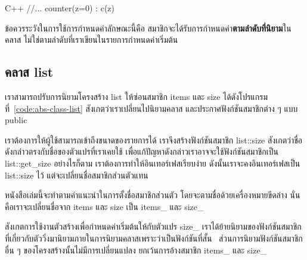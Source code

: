 \latintext
\begin{codelist}{C++}{}
  //...
  counter(z=0) : c(z) {}
\end{codelist}
\thaitext

ข้อ{\wbr}ควร{\wbr}ระวัง{\wbr}ใน{\wbr}การ{\wbr}ใช้{\wbr}การ{\wbr}กำหนด{\wbr}ค่า{\wbr}ลักษณะ{\wbr}นี้{\wbr}คือ{\wbr}
สมาชิก{\wbr}จะ{\wbr}ได้{\wbr}รับ{\wbr}การ{\wbr}กำหนด{\wbr}ค่า{\bf ตาม{\wbr}ลำดับ{\wbr}ที่{\wbr}นิยาม}ใน{\wbr}ค{\wbr}ลา{\wbr}ส
ไม่{\wbr}ใช่{\wbr}ตาม{\wbr}ลำดับ{\wbr}ที่{\wbr}เรา{\wbr}เขียน{\wbr}ใน{\wbr}รายการ{\wbr}กำหนด{\wbr}ค่า{\wbr}เริ่มต้น{\wbr}

\subsection{ค{\wbr}ลา{\wbr}ส {\ct list}}

เรา{\wbr}สามารถ{\wbr}ปรับ{\wbr}การ{\wbr}นิยาม{\wbr}โครงสร้าง {\ct list} ให้{\wbr}ซ่อน{\wbr}สมาชิก {\ct items} และ {\ct
  size} ได้{\wbr}ดัง{\wbr}โปรแกรม{\wbr}ที่~\ref{code:abs-class-list}
สังเกต{\wbr}ว่า{\wbr}เรา{\wbr}เปลี่ยน{\wbr}ไป{\wbr}นิยาม{\wbr}ค{\wbr}ลา{\wbr}ส และ{\wbr}ประกาศ{\wbr}ฟังก์ชัน{\wbr}สมาชิก{\wbr}ต่าง ๆ แบบ {\ct public}

เรา{\wbr}ต้องการ{\wbr}ให้{\wbr}ผู้ใช้{\wbr}สามารถ{\wbr}เข้าถึง{\wbr}ขนาด{\wbr}ของ{\wbr}รายการ{\wbr}ได้ เรา{\wbr}จึง{\wbr}สร้าง{\wbr}ฟังก์ชัน{\wbr}สมาชิก {\ct
  list::size} สังเกต{\wbr}ว่า{\wbr}ชื่อดัง{\wbr}กล่าว{\wbr}ตรง{\wbr}กับ{\wbr}ชื่อ{\wbr}ของ{\wbr}ตัวแปร{\wbr}ที่{\wbr}เรา{\wbr}เคย{\wbr}ใช้{\wbr}
เพื่อ{\wbr}แก้{\wbr}ปัญหา{\wbr}ดังกล่าว{\wbr}เรา{\wbr}อาจ{\wbr}จะ{\wbr}ใช้{\wbr}ฟังก์ชัน{\wbr}สมาชิก{\wbr}เป็น {\ct list::get\_size}
อย่างไรก็ตาม เรา{\wbr}ต้องการ{\wbr}ทำ{\wbr}ให้{\wbr}อิน{\wbr}เทอร์เฟส{\wbr}เรียบ{\wbr}ง่าย ดังนั้น{\wbr}เรา{\wbr}จะ{\wbr}คง{\wbr}อิน{\wbr}เทอร์เฟส{\wbr}เป็น {\ct
  list::size} ไว้ แต่{\wbr}จะ{\wbr}เปลี่ยน{\wbr}ชื่อ{\wbr}สมาชิก{\wbr}ส่วนตัว{\wbr}แทน{\wbr}

หนังสือ{\wbr}เล่ม{\wbr}นี้{\wbr}จะ{\wbr}ทำ{\wbr}ตาม{\wbr}คำแนะนำ{\wbr}ใน{\wbr}การ{\wbr}ตั้ง{\wbr}ชื่อ{\wbr}สมาชิก{\wbr}ส่วนตัว โดย{\wbr}จะ{\wbr}ตาม{\wbr}ชื่อ{\wbr}ด้วย{\wbr}เครื่องหมาย{\wbr}ขีด{\wbr}ล่าง{\wbr}
นั่น{\wbr}คือ{\wbr}เรา{\wbr}จะ{\wbr}เปลี่ยน{\wbr}ชื่อ{\wbr}จาก {\ct items} และ {\ct size} เป็น {\ct items\_} และ{\wbr}
{\ct size\_}

สังเกต{\wbr}การ{\wbr}ใช้{\wbr}งาน{\wbr}ตัว{\wbr}สร้าง{\wbr}เพื่อ{\wbr}กำหนด{\wbr}ค่า{\wbr}เริ่มต้น{\wbr}ให้{\wbr}กับ{\wbr}ตัวแปร {\ct size\_}
เรา{\wbr}ได้{\wbr}ย้าย{\wbr}นิยาม{\wbr}ของ{\wbr}ฟังก์ชัน{\wbr}สมาชิก{\wbr}ที่{\wbr}เกี่ยวกับ{\wbr}ตัว{\wbr}วิ่ง{\wbr}มา{\wbr}นิยาม{\wbr}ภายใน{\wbr}การ{\wbr}นิยาม{\wbr}ค{\wbr}ลา{\wbr}ส{\wbr}เพราะว่า{\wbr}เป็น{\wbr}ฟังก์ชัน{\wbr}ที่{\wbr}สั้น{\wbr}
\ ส่วน{\wbr}การ{\wbr}นิยาม{\wbr}ฟังก์ชัน{\wbr}สมาชิก{\wbr}อื่น ๆ ของ{\wbr}โครงสร้าง{\wbr}นั้น{\wbr}ไม่{\wbr}มี{\wbr}การ{\wbr}เปลี่ยนแปลง{\wbr}
ยกเว้น{\wbr}การ{\wbr}อ้าง{\wbr}สมาชิก {\ct items\_} และ {\ct size\_}

